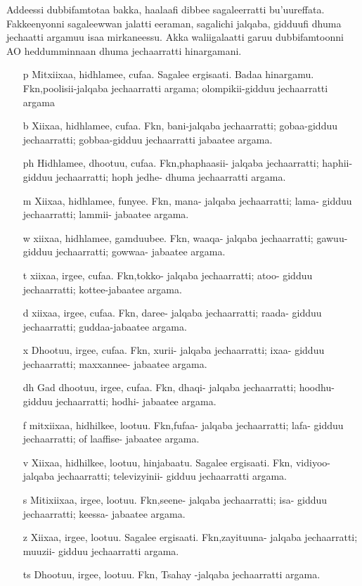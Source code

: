 \documentclass[11pt,b5paper]{book}
\begin{document}
Addeessi dubbifamtotaa bakka, haalaafi dibbee sagaleerratti  bu’uureffata. Fakkeenyonni sagaleewwan jalatti eeraman,  sagalichi jalqaba, gidduufi dhuma jechaatti argamuu isaa  mirkaneessu. Akka waliigalaatti garuu dubbifamtoonni AO  heddumminnaan dhuma jechaarratti hinargamani.
\begin{itemize}
  \item[p] Mitxiixaa, hidhlamee, cufaa. Sagalee ergisaati. Badaa  hinargamu. Fkn,poolisii-jalqaba jechaarratti argama; olompikii-gidduu jechaarratti argama
  \item[b] Xiixaa, hidhlamee, cufaa. Fkn, bani-jalqaba jechaarratti; gobaa-gidduu jechaarratti; gobbaa-gidduu jechaarratti jabaatee argama.
  \item[ph] Hidhlamee, dhootuu, cufaa. Fkn,phaphaasii- jalqaba jechaarratti; haphii-gidduu jechaarratti; hoph jedhe- dhuma jechaarratti argama.
  \item[m] Xiixaa, hidhlamee, funyee. Fkn, mana- jalqaba jechaarratti; lama- gidduu jechaarratti; lammii- jabaatee argama. 
  \item[w] xiixaa, hidhlamee, gamduubee. Fkn, waaqa- jalqaba jechaarratti; gawuu-gidduu jechaarratti; gowwaa- jabaatee argama.
  \item[t] xiixaa, irgee, cufaa. Fkn,tokko- jalqaba jechaarratti; atoo- gidduu jechaarratti; kottee-jabaatee argama. 
  \item[d] xiixaa, irgee, cufaa. Fkn, daree- jalqaba jechaarratti; raada- gidduu jechaarratti; guddaa-jabaatee argama.
  \item[x] Dhootuu, irgee, cufaa. Fkn, xurii- jalqaba jechaarratti; ixaa- gidduu jechaarratti; maxxannee- jabaatee argama.
  \item[dh] Gad dhootuu, irgee, cufaa. Fkn, dhaqi- jalqaba jechaarratti; hoodhu- gidduu jechaarratti; hodhi- jabaatee argama.
  \item[f] mitxiixaa, hidhilkee, lootuu. Fkn,fufaa- jalqaba jechaarratti; lafa- gidduu jechaarratti; of laaffise- jabaatee argama.
  \item[v] Xiixaa, hidhilkee, lootuu, hinjabaatu. Sagalee ergisaati.  Fkn, vidiyoo- jalqaba jechaarratti; televizyinii- gidduu jechaarratti argama.
  \item[s] Mitixiixaa, irgee, lootuu. Fkn,seene- jalqaba jechaarratti; isa- gidduu jechaarratti; keessa- jabaatee argama. 
  \item[z] Xiixaa, irgee, lootuu. Sagalee ergisaati. Fkn,zayituuna- jalqaba jechaarratti; muuzii- gidduu jechaarratti argama.
  \item[ts] Dhootuu, irgee, lootuu. Fkn, Tsahay -jalqaba jechaarratti argama.

\end{itemize}
\end{document}
